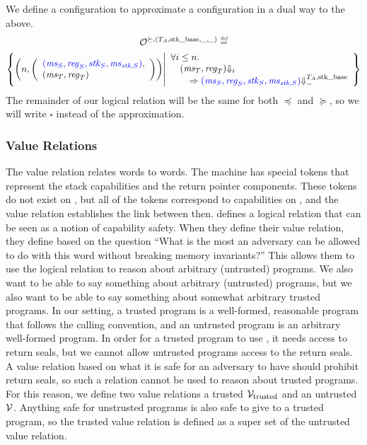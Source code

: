 \begin{jversion}
We define a \trgcm{} configuration to approximate a \srccm{} configuration in a dual way to the above.
\begin{multline*}
  \lro[\succeq,(\ta,\stkb,\_,\_)] \defeq \\\left\{ \npair{\left(\array{l}\src{(\ms_S,\reg_S,\stk_S,\ms_{\stk,S})},\\(\ms_T,\reg_T)\endarray\right)} \middle|
    \begin{array}{l}
      \forall i \leq n \ldotp \\ 
      \quad (\ms_T ,\reg_T) \term[i] \\\qquad\Rightarrow \src{(\ms_S,\reg_S,\stk_S,\ms_{\stk,S})} \sterm{\ta,\stkb}
    \end{array}
\right\}
\end{multline*}
The remainder of our logical relation will be the same for both $\preceq$ and $\succeq$, so we will write $\square$ instead of the approximation.

\subsubsection{Value Relations}
The value relation relates \trgcm{} words to \srccm{} words.
The \srccm{} machine has special tokens that represent the stack capabilities and the return pointer components.
These tokens do not exist on \trgcm{}, but all of the tokens correspond to capabilities on \trgcm{}, and the value relation establishes the link between then.
\citet{skorstengaard_reasoning_2017} defines a logical relation that can be seen as a notion of capability safety.
When they define their value relation, they define based on the question ``What is the most an adversary can be allowed to do with this word without breaking memory invariants?''
This allows them to use the logical relation to reason about arbitrary (untrusted) programs.
We also want to be able to say something about arbitrary (untrusted) programs, but we also want to be able to say something about somewhat arbitrary trusted programs.
In our setting, a trusted program is a well-formed, reasonable program that follows the \stktokens{} calling convention, and an untrusted program is an arbitrary well-formed program.
In order for a trusted program to use \stktokens{}, it needs access to return seals, but we cannot allow untrusted programs access to the return seals.
A value relation based on what it is safe for an adversary to have should prohibit return seals, so such a relation cannot be used to reason about trusted programs.
For this reason, we define two value relations a trusted $\mathcal{V}_{\mathrm{trusted}}$ and an untrusted $\mathcal{V}$.
Anything safe for unstrusted programs is also safe to give to a trusted program, so the trusted value relation is defined as a super set of the untrusted value relation.


\end{jversion}
